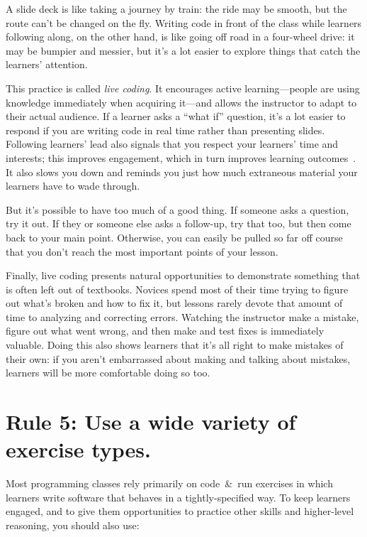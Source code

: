 \documentclass[10pt,letterpaper]{article}
\newcommand{\rulemajor}[1]{\section{#1}}
\begin{document}
A slide deck is like taking a journey by train:
the ride may be smooth,
but the route can't be changed on the fly.
Writing code in front of the class while learners following along,
on the other hand,
is like going off road in a four-wheel drive:
it may be bumpier and messier,
but it's a lot easier to explore things that catch the learners' attention.

This practice is called \emph{live coding}.
It encourages active learning---people are using knowledge immediately
when acquiring it---and allows the instructor to adapt to their actual audience.
If a learner asks a ``what if'' question,
it's a lot easier to respond if you are writing code in real time
rather than presenting slides.
Following learners' lead also signals that you respect your learners' time and interests;
this improves engagement,
which in turn improves learning outcomes~\cite{Wlod2017}.
It also slows you down
and reminds you just how much extraneous material your learners have to wade through.

But it's possible to have too much of a good thing.
If someone asks a question, try it out.
If they or someone else asks a follow-up,
try that too,
but then come back to your main point.
Otherwise,
you can easily be pulled so far off course that
you don't reach the most important points of your lesson.

Finally,
live coding presents natural opportunities to demonstrate something that is often left out of textbooks.
Novices spend most of their time trying to figure out what's broken and how to fix it,
but lessons rarely devote that amount of time to analyzing and correcting errors.
Watching the instructor make a mistake,
figure out what went wrong,
and then make and test fixes is immediately valuable.
Doing this also shows learners that it's all right to make mistakes of their own:
if you aren't embarrassed about making and talking about mistakes,
learners will be more comfortable doing so too.

\rulemajor{Rule 5: Use a wide variety of exercise types.}

Most programming classes rely primarily on code~\&~run exercises
in which learners write software that behaves in a tightly-specified way.
To keep learners engaged,
and to give them opportunities to practice other skills and higher-level reasoning,
you should also use:
\end{document}
